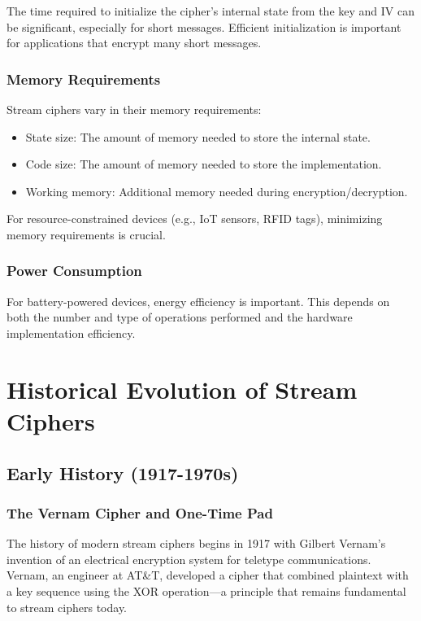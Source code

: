 \documentclass[12pt,a4paper,oneside]{report}
\begin{document}
The time required to initialize the cipher's internal state from the key and IV can be significant, especially for short messages. Efficient initialization is important for applications that encrypt many short messages.

\subsection{Memory Requirements}

Stream ciphers vary in their memory requirements:

\begin{itemize}
    \item State size: The amount of memory needed to store the internal state.
    \item Code size: The amount of memory needed to store the implementation.
    \item Working memory: Additional memory needed during encryption/decryption.
\end{itemize}

For resource-constrained devices (e.g., IoT sensors, RFID tags), minimizing memory requirements is crucial.

\subsection{Power Consumption}

For battery-powered devices, energy efficiency is important. This depends on both the number and type of operations performed and the hardware implementation efficiency.

\chapter{Historical Evolution of Stream Ciphers}
\label{ch:history}

\section{Early History (1917-1970s)}
\label{sec:early-history}

\subsection{The Vernam Cipher and One-Time Pad}

The history of modern stream ciphers begins in 1917 with Gilbert Vernam's invention of an electrical encryption system for teletype communications. Vernam, an engineer at AT\&T, developed a cipher that combined plaintext with a key sequence using the XOR operation—a principle that remains fundamental to stream ciphers today.
\end{document}
